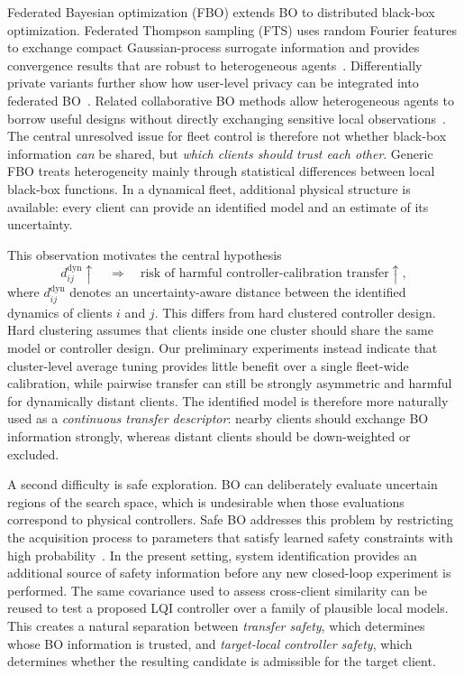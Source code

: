 \documentclass[conference]{IEEEtran}
\newcommand{\distdyn}{d^{\mathrm{dyn}}}
\begin{document}
Federated Bayesian optimization (FBO) extends BO to distributed black-box optimization. Federated Thompson sampling (FTS) uses random Fourier features to exchange compact Gaussian-process surrogate information and provides convergence results that are robust to heterogeneous agents~\cite{dai2020fts}. Differentially private variants further show how user-level privacy can be integrated into federated BO~\cite{dai2021dpfts}. Related collaborative BO methods allow heterogeneous agents to borrow useful designs without directly exchanging sensitive local observations~\cite{chen2025collaborative}. The central unresolved issue for fleet control is therefore not whether black-box information \emph{can} be shared, but \emph{which clients should trust each other}. Generic FBO treats heterogeneity mainly through statistical differences between local black-box functions. In a dynamical fleet, additional physical structure is available: every client can provide an identified model and an estimate of its uncertainty.

This observation motivates the central hypothesis
\begin{equation}
    \distdyn_{ij} \uparrow
    \quad \Longrightarrow \quad
    \text{risk of harmful controller-calibration transfer} \uparrow,
    \label{eq:intro_hypothesis}
\end{equation}
where $\distdyn_{ij}$ denotes an uncertainty-aware distance between the identified dynamics of clients $i$ and $j$. This differs from hard clustered controller design. Hard clustering assumes that clients inside one cluster should share the same model or controller design. Our preliminary experiments instead indicate that cluster-level average tuning provides little benefit over a single fleet-wide calibration, while pairwise transfer can still be strongly asymmetric and harmful for dynamically distant clients. The identified model is therefore more naturally used as a \emph{continuous transfer descriptor}: nearby clients should exchange BO information strongly, whereas distant clients should be down-weighted or excluded.

A second difficulty is safe exploration. BO can deliberately evaluate uncertain regions of the search space, which is undesirable when those evaluations correspond to physical controllers. Safe BO addresses this problem by restricting the acquisition process to parameters that satisfy learned safety constraints with high probability~\cite{berkenkamp2016safe,berkenkamp2023safe}. In the present setting, system identification provides an additional source of safety information before any new closed-loop experiment is performed. The same covariance used to assess cross-client similarity can be reused to test a proposed LQI controller over a family of plausible local models. This creates a natural separation between \emph{transfer safety}, which determines whose BO information is trusted, and \emph{target-local controller safety}, which determines whether the resulting candidate is admissible for the target client.
\end{document}
